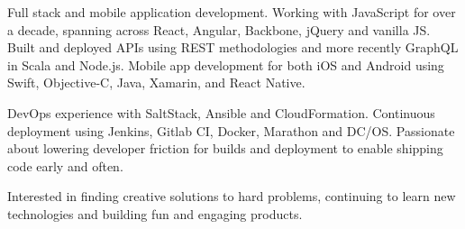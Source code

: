 
\begin{cvparagraph}
Full stack and mobile application development. Working with JavaScript for over a decade, spanning across React, Angular, Backbone, jQuery and vanilla JS. Built and deployed APIs using REST methodologies and more recently GraphQL in Scala and Node.js. Mobile app development for both iOS and Android using Swift, Objective-C, Java, Xamarin, and React Native.

DevOps experience with SaltStack, Ansible and CloudFormation. Continuous deployment using Jenkins, Gitlab CI, Docker, Marathon and DC/OS. Passionate about lowering developer friction for builds and deployment to enable shipping code early and often.

Interested in finding creative solutions to hard problems, continuing to learn new technologies and building fun and engaging products.
\end{cvparagraph}
